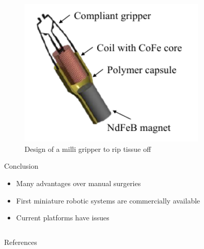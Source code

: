 \documentclass{beamer}
\begin{document}
\begin{frame}
\begin{columns}[]
\begin{column}{0.45\textwidth}
        \vspace*{20pt}
        
        \begin{figure}
            \centering
            \includegraphics[width=0.8\textwidth]{figures/structure_gripper.png}
            \caption{Design of a milli gripper to rip tissue off \cite{MilliGripper}}
            \label{fig:duck3}
        \end{figure}
        
        \vspace*{40pt}
        
        \begin{block}{\LARGE Conclusion}
	        \justifying \normalsize 
	        \begin{itemize}
                \item Many advantages over manual surgeries
                \item First miniature robotic systems are commercially available
	            \item Current platforms have issues
	        \end{itemize}
        \end{block}
    
    \end{column}
    
\end{columns}

\begin{block}{References}
    \printbibliography
\end{block}

\end{frame}
\end{document}
